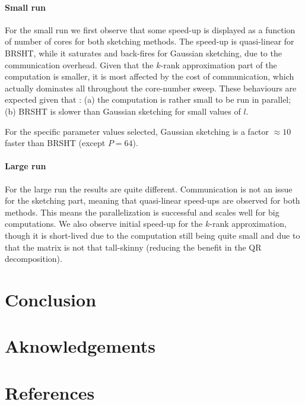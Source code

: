 \documentclass[a4paper, 12pt,oneside]{article}
\begin{document}
			\paragraph{Small run}
			For the small run we first observe that some speed-up is displayed as a function of number of cores for both sketching methods. The speed-up is quasi-linear for BRSHT, while it saturates and back-fires for Gaussian sketching, due to the communication overhead. Given that the $k$-rank approximation part of the computation is smaller, it is most affected by the cost of communication, which actually dominates all throughout the core-number sweep.   
			These behaviours are expected given that : (a) the computation is rather small to be run in parallel; (b) BRSHT is slower than Gaussian sketching for small values of $l$. 
			
			For the specific parameter values selected, Gaussian sketching is a factor $\approx 10$ faster than BRSHT (except $P=64$).
			\paragraph{Large run}
			For the large run the results are quite different. Communication is not an issue for the sketching part, meaning that quasi-linear speed-ups are observed for both methods. This means the parallelization is successful and scales well for big computations. We also observe initial speed-up for the $k$-rank approximation, though it is short-lived due to the computation still being quite small and due to that the matrix is not that tall-skinny (reducing the benefit in the QR decomposition). 
	\section{Conclusion}
	\section*{Aknowledgements}
	\section*{References}
\end{document}
